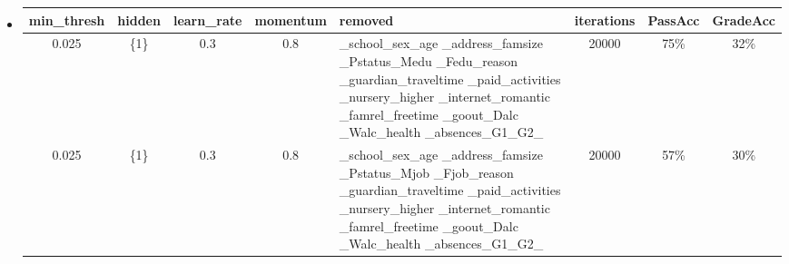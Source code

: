 \documentclass[11pt]{article}
\begin{document}
\begin{itemize}
\item
\begin{tabular}{| c | c | c | c | p{3cm} | c | c | c |}
\hline \textbf{min\_thresh} & \textbf{hidden} & \textbf{learn\_rate} & \textbf{momentum} & \textbf{removed} & \textbf{iterations} & \textbf{PassAcc} & \textbf{GradeAcc}\\
\hline 0.025 & \{1\} & 0.3 & 0.8 & \_school\_sex\_age \_address\_famsize \_Pstatus\_Medu \_Fedu\_reason \_guardian\_traveltime \_paid\_activities \_nursery\_higher \_internet\_romantic \_famrel\_freetime \_goout\_Dalc \_Walc\_health \_absences\_G1\_G2\_ & 20000 & 75\% & 32\%\\
\hline 0.025 & \{1\} & 0.3 & 0.8 & \_school\_sex\_age \_address\_famsize \_Pstatus\_Mjob \_Fjob\_reason \_guardian\_traveltime \_paid\_activities \_nursery\_higher \_internet\_romantic \_famrel\_freetime \_goout\_Dalc \_Walc\_health \_absences\_G1\_G2\_ & 20000 & 57\% & 30\%\\
\hline
\end{tabular}


\end{itemize}
\end{document}
